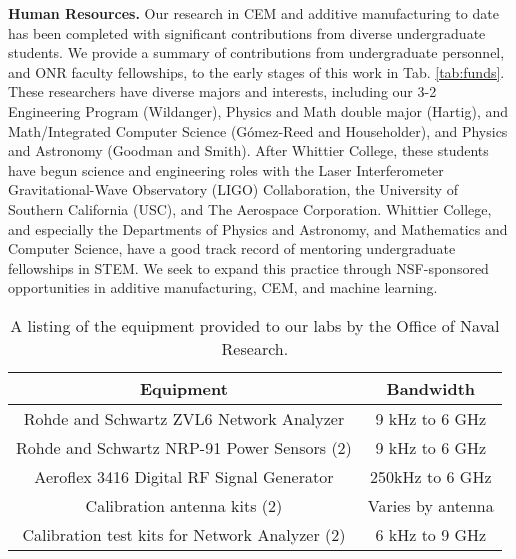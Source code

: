 \documentclass[../../main.tex]{subfiles}
\begin{document}
\textbf{Human Resources.} Our research in CEM and additive manufacturing to date has been completed with significant contributions from diverse undergraduate students.  We provide a summary of contributions from undergraduate personnel, and ONR faculty fellowships, to the early stages of this work in Tab. \ref{tab:funds}.  These researchers have diverse majors and interests, including our 3-2 Engineering Program (Wildanger), Physics and Math double major (Hartig), and Math/Integrated Computer Science (G\'{o}mez-Reed and Householder), and Physics and Astronomy (Goodman and Smith).   After Whittier College, these students have begun science and engineering roles with the Laser Interferometer Gravitational-Wave Observatory (LIGO) Collaboration, the University of Southern California (USC), and The Aerospace Corporation.  Whittier College, and especially the Departments of Physics and Astronomy, and Mathematics and Computer Science, have a good track record of mentoring undergraduate fellowships in STEM.  We seek to expand this practice through NSF-sponsored opportunities in additive manufacturing, CEM, and machine learning.\\ \vspace{2.5mm}

\begin{table}
\centering
\begin{tabular}{c c}
Equipment & Bandwidth \\ \hline
Rohde and Schwartz ZVL6 Network Analyzer & 9 kHz to 6 GHz \\
Rohde and Schwartz NRP-91 Power Sensors (2) & 9 kHz to 6 GHz \\
Aeroflex 3416 Digital RF Signal Generator & 250kHz to 6 GHz \\
Calibration antenna kits (2) & Varies by antenna \\
Calibration test kits for Network Analyzer (2) & 6 kHz to 9 GHz
\end{tabular}
\caption{\label{tab:equip} A listing of the equipment provided to our labs by the Office of Naval Research.}
\end{table}
\end{document}
